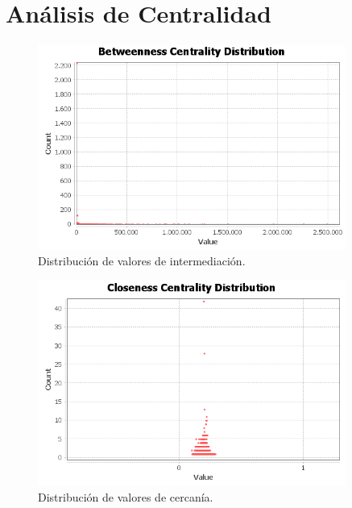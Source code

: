 \section{Análisis de Centralidad}

\begin{figure}[H]
    \centerfloat
    \includegraphics[width=0.9\textwidth]{img/resultados/distanciaGrafo/Betweenness Centrality Distribution.png}
    \caption{Distribución de valores de intermediación.}
\end{figure}

\begin{figure}[H]
    \centerfloat
    \includegraphics[width=0.9\textwidth]{img/resultados/distanciaGrafo/Closeness Centrality Distribution.png}
    \caption{Distribución de valores de cercanía.}
\end{figure}

